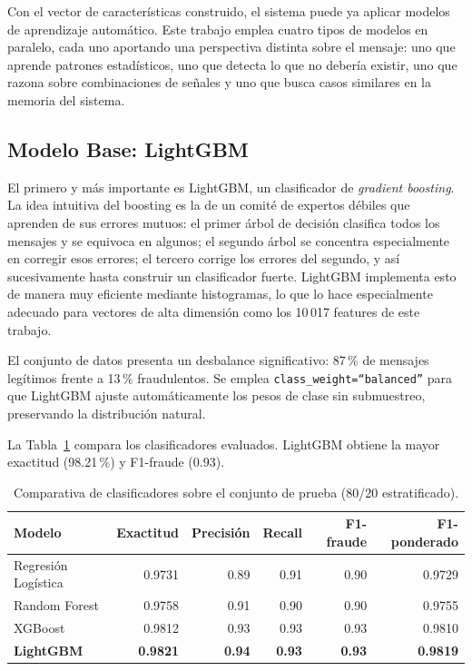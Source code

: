\documentclass{llncs}
\begin{document}
Con el vector de características construido, el sistema puede ya
aplicar modelos de aprendizaje automático.
Este trabajo emplea cuatro tipos de modelos en paralelo, cada uno
aportando una perspectiva distinta sobre el mensaje: uno que aprende
patrones estadísticos, uno que detecta lo que no debería existir,
uno que razona sobre combinaciones de señales y uno que busca
casos similares en la memoria del sistema.

\subsection{Modelo Base: LightGBM}
\label{sec:ml:lgbm}

El primero y más importante es LightGBM, un clasificador de
\emph{gradient boosting}.
La idea intuitiva del boosting es la de un comité de expertos débiles
que aprenden de sus errores mutuos: el primer árbol de decisión
clasifica todos los mensajes y se equivoca en algunos;
el segundo árbol se concentra especialmente en corregir esos errores;
el tercero corrige los errores del segundo, y así sucesivamente
hasta construir un clasificador fuerte.
LightGBM implementa esto de manera muy eficiente mediante histogramas,
lo que lo hace especialmente adecuado para vectores de alta dimensión
como los 10\,017 features de este trabajo.

El conjunto de datos presenta un desbalance significativo:
87\,\% de mensajes legítimos frente a 13\,\% fraudulentos.
Se emplea \texttt{class\_weight=``balanced''} para que LightGBM
ajuste automáticamente los pesos de clase sin submuestreo,
preservando la distribución natural.

La Tabla~\ref{tab:ml} compara los clasificadores evaluados.
LightGBM obtiene la mayor exactitud (98.21\,\%) y F1-fraude (0.93).

\begin{table}[t]
\caption{Comparativa de clasificadores sobre el conjunto de prueba
(80/20 estratificado).}
\label{tab:ml}
\centering
\begin{tabular}{lrrrrr}
\toprule
Modelo & Exactitud & Precisión & Recall & F1-fraude & F1-ponderado \\
\midrule
Regresión Logística & 0.9731 & 0.89 & 0.91 & 0.90 & 0.9729 \\
Random Forest       & 0.9758 & 0.91 & 0.90 & 0.90 & 0.9755 \\
XGBoost             & 0.9812 & 0.93 & 0.93 & 0.93 & 0.9810 \\
\textbf{LightGBM}   & \textbf{0.9821} & \textbf{0.94} & \textbf{0.93} & \textbf{0.93} & \textbf{0.9819} \\
\bottomrule
\end{tabular}
\end{table}
\end{document}
